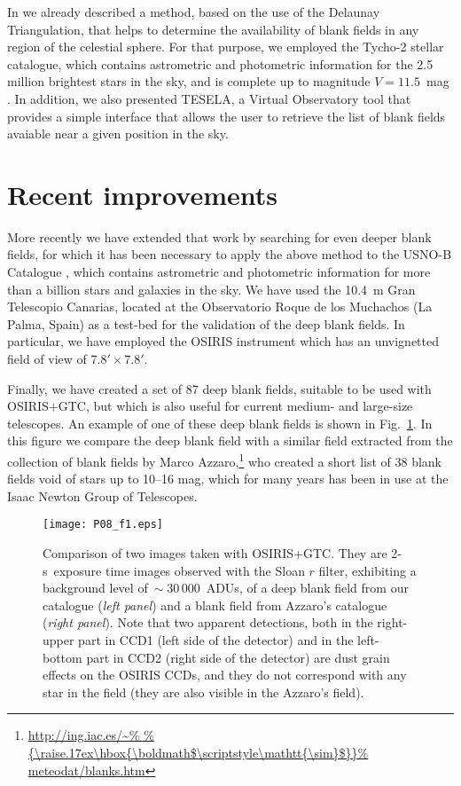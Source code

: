 \documentclass[11pt,twoside]{article}
\begin{document}
In \citet[][hereafter paper~I]{2011MNRAS.417.3061C} \citep[see also
contribution in previous ADASS~2011:][]{2012ASPC..461..173C} we already
described a method, based on the use of the Delaunay Triangulation, that helps
to determine the availability of blank fields in any region of the celestial
sphere. For that purpose, we employed the Tycho-2 stellar catalogue, which
contains astrometric and photometric information for the 2.5 million brightest
stars in the sky, and is complete up to magnitude $V=11.5$~mag
\citep{1997A&A...323L..49P}. In addition, we also presented TESELA, a Virtual
Observatory tool that provides a simple interface that allows the user to
retrieve the list of blank fields avaiable near a given position in the sky.

\section{Recent improvements}

More recently \citep[][hereafter paper~II]{2012arXiv1209.4861J} we have
extended that work by searching for even deeper blank fields, for which it has
been necessary to apply the above method to the USNO-B Catalogue
\citep{2003AJ....125..984M}, which contains astrometric and photometric
information for more than a billion stars and galaxies in the sky. We have used
the 10.4~m Gran Telescopio Canarias, located at the Observatorio Roque de los
Muchachos (La Palma, Spain) as a test-bed for the validation of the deep blank
fields. In particular, we have employed the OSIRIS instrument
\citep{2000SPIE.4008..623C} which has an unvignetted field of view of $7.8'
\times 7.8'$. 

Finally, we have created a set of 87 deep blank fields, suitable
to be used with OSIRIS+GTC, but which is also useful for current medium- and
large-size telescopes. An example of one of these deep blank fields is shown in
Fig.~\ref{example_DBF}. In this figure we compare the deep blank field with a
similar field extracted from the collection of blank fields by Marco
Azzaro,\footnote{\url{http://ing.iac.es/~%
meteodat/blanks.htm}}
who created a short list of 38 blank fields void of stars up to 10--16 mag,
which for many years has been in use at the Isaac Newton Group of Telescopes.

\begin{figure}
\centerline{%
\texttt{[image: P08\_f1.eps]}}
\caption{Comparison of two images taken with OSIRIS+GTC. They are \mbox{2-s
exposure} time images observed with the Sloan $r$ filter, exhibiting a
background level of$~\sim 30\,000$~ADUs, of a deep blank field from our
catalogue (\emph{left panel}) and a blank field from Azzaro's catalogue
(\emph{right panel}). Note that two apparent detections, both in the
right-upper part in CCD1 (left side of the detector) and in the left-bottom
part in CCD2 (right side of the detector) are dust grain effects on the OSIRIS
CCDs, and they do not correspond with any star in the field (they are also
visible in the Azzaro's field).}
\label{example_DBF}
\end{figure}
\end{document}
